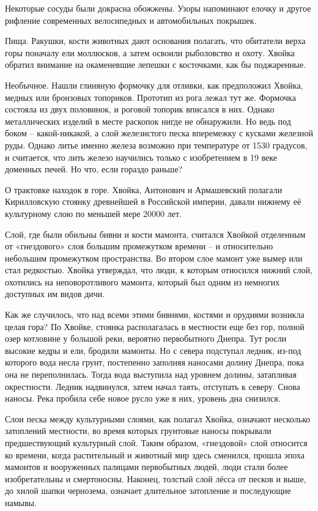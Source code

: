 Некоторые сосуды были докрасна обожжены. Узоры напоминают елочку и другое рифление современных велосипедных и автомобильных покрышек.

Пища. Ракушки, кости животных дают основания полагать, что обитатели верха горы поначалу ели моллюсков, а затем освоили рыболовство и охоту. Хвойка обратил внимание на окаменевшие лепешки с косточками, как бы поджаренные.   

Необычное. Нашли глиняную формочку для отливки, как предположил Хвойка, медных или бронзовых топориков. Прототип из рога лежал тут же. Формочка состояла из двух половинок, и роговой топорик вписался в них. Однако металлических изделий в месте раскопок нигде не обнаружили. Но ведь под боком – какой-никакой, а слой железистого песка вперемежку с кусками железной руды. Однако литье именно железа возможно при температуре от 1530 градусов, и считается, что лить железо научились только с изобретением в 19 веке доменных печей. Но что, если гораздо раньше?

О трактовке находок в горе. Хвойка, Антонович и Армашевский полагали Кирилловскую стоянку древнейшей в Российской империи, давали нижнему её культурному слою по меньшей мере 20000 лет.

Слой, где были обильны бивни и кости мамонта, считался Хвойкой отделенным от «гнездового» слоя большим промежутком времени – и относительно небольшим промежутком пространства. Во втором слое мамонт уже вымер или стал редкостью. Хвойка утверждал, что люди, к которым относился нижний слой, охотились на неповоротливого мамонта, который был одним из немногих доступных им видов дичи.

Как же случилось, что над всеми этими бивнями, костями и орудиями возникла целая гора? По Хвойке, стоянка располагалась в местности еще без гор, полной озер котловине у большой реки, вероятно первобытного Днепра. Тут росли высокие кедры и ели, бродили мамонты. Но с севера подступал ледник, из-под которого вода несла грунт, постепенно заполняя наносами долину Днепра, пока она не переполнилась. Тогда вода выступила над уровнем долины, затапливая окрестности. Ледник надвинулся, затем начал таять, отступать к северу. Снова наносы. Река пробила себе новое русло уже в них, уровень дна снизился.

Слои песка между культурными слоями, как полагал Хвойка, означают несколько затоплений местности, во время которых грунтовые наносы покрывали предшествующий культурный слой. Таким образом, «гнездовой» слой относится ко времени, когда растительный и животный мир здесь сменился, прошла эпоха мамонтов и вооруженных палицами первобытных людей, люди стали более изобретательны и смертоносны. Наконец, толстый слой лёсса от песков и выше, до хилой шапки чернозема, означает длительное затопление и последующие намывы.

